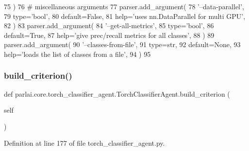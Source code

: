 \begin{DoxyCode}
75         )
76         \textcolor{comment}{# miscellaneous arguments}
77         parser.add\_argument(
78             \textcolor{stringliteral}{'--data-parallel'},
79             type=\textcolor{stringliteral}{'bool'},
80             default=\textcolor{keyword}{False},
81             help=\textcolor{stringliteral}{'uses nn.DataParallel for multi GPU'},
82         )
83         parser.add\_argument(
84             \textcolor{stringliteral}{'--get-all-metrics'},
85             type=\textcolor{stringliteral}{'bool'},
86             default=\textcolor{keyword}{True},
87             help=\textcolor{stringliteral}{'give prec/recall metrics for all classes'},
88         )
89         parser.add\_argument(
90             \textcolor{stringliteral}{'--classes-from-file'},
91             type=str,
92             default=\textcolor{keywordtype}{None},
93             help=\textcolor{stringliteral}{'loads the list of classes from a file'},
94         )
95 
\end{DoxyCode}
\mbox{\label{classparlai_1_1core_1_1torch__classifier__agent_1_1TorchClassifierAgent_adeab756c0b58667aaf417575c23d1dfb}} 
\subsubsection{\texorpdfstring{build\+\_\+criterion()}{build\_criterion()}}
{\footnotesize\ttfamily def parlai.\+core.\+torch\+\_\+classifier\+\_\+agent.\+Torch\+Classifier\+Agent.\+build\+\_\+criterion (\begin{DoxyParamCaption}\item[{}]{self }\end{DoxyParamCaption})}



Definition at line 177 of file torch\+\_\+classifier\+\_\+agent.\+py.


